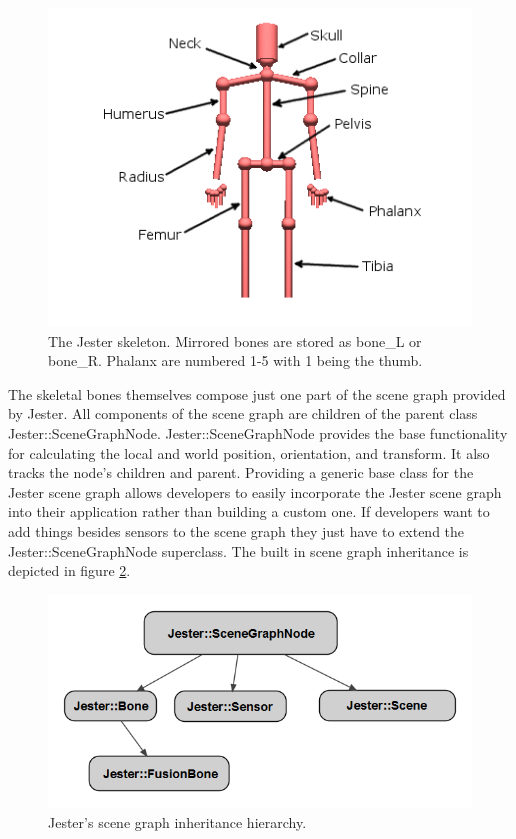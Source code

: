 \begin{figure}[]
\centering
\includegraphics[width=.75\textwidth]{figures/boneLabels}
\caption{The Jester skeleton. Mirrored bones are stored as bone\_L or bone\_R. Phalanx are numbered 1-5 with 1 being the thumb.}
\label{fig:skeleton}
\end{figure}

The skeletal bones themselves compose just one part of the scene graph provided by Jester. All components of the scene graph are children of the parent class Jester::SceneGraphNode. Jester::SceneGraphNode provides the base functionality for calculating the local and world position, orientation, and transform. It also tracks the node’s children and parent. Providing a generic base class for the Jester scene graph allows developers to easily incorporate the Jester scene graph into their application rather than building a custom one. If developers want to add things besides sensors to the scene graph they just have to extend the Jester::SceneGraphNode superclass. The built in scene graph inheritance is depicted in figure \ref{fig:scene_graph_inh}.

\begin{figure}[]
\centering
\includegraphics[width=.75\textwidth]{figures/sceneInh}
\caption{Jester's scene graph inheritance hierarchy.}
\label{fig:scene_graph_inh}
\end{figure}

